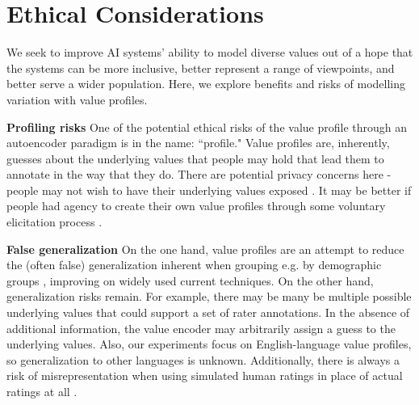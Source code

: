 \documentclass[11pt]{article}
\begin{document}
\section{Ethical Considerations}
\label{sec:ethicalconsiderations}

We seek to improve AI systems' ability to model diverse values out of a hope that the systems can be more inclusive, better represent a range of viewpoints, and better serve a wider population. Here, we explore benefits and risks of modelling variation with value profiles.

\textbf{Profiling risks}
One of the potential ethical risks of the value profile through an autoencoder paradigm is in the name: ``profile." Value profiles are, inherently, guesses about the underlying values that people may hold that lead them to annotate in the way that they do. There are potential privacy concerns here - people may not wish to have their underlying values exposed \citep{tomasev-etal}.
It may be better if people had agency to create their own value profiles through some voluntary elicitation process \citep{park2024generativeagentsimulations1000}.


\textbf{False generalization}
On the one hand, value profiles are an attempt to reduce the (often false) generalization inherent when grouping e.g. by demographic groups \cite{dev-etal-2022-measures}, improving on widely used current techniques. On the other hand, generalization risks remain. For example, there may be many be multiple possible underlying values that could support a set of rater annotations. In the absence of additional information, the value encoder may arbitrarily assign a guess to the underlying values.
Also, our experiments focus on English-language value profiles, so generalization to other languages is unknown.
Additionally, there is always a risk of misrepresentation when using simulated human ratings in place of actual ratings at all \citep{agnew:2024}.
\end{document}
